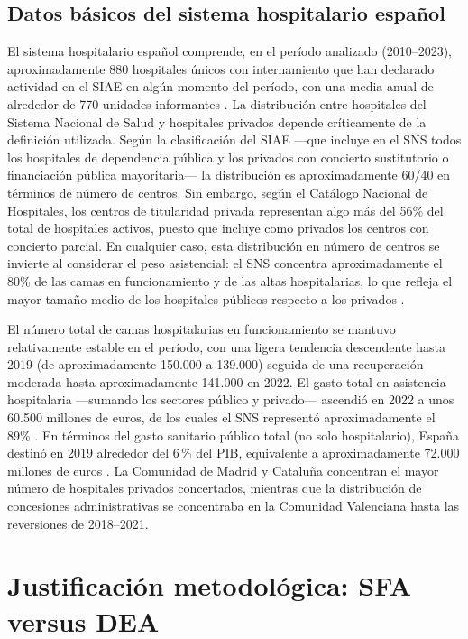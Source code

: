 \subsection{Datos básicos del sistema hospitalario español}

El sistema hospitalario español comprende, en el período analizado 
(2010--2023), aproximadamente 880 hospitales únicos con internamiento 
que han declarado actividad en el SIAE en algún momento del período, 
con una media anual de alrededor de 770 unidades informantes 
\citep{ministerio_siae2023}. La distribución entre hospitales del 
Sistema Nacional de Salud y hospitales privados depende críticamente 
de la definición utilizada. Según la clasificación del SIAE 
---que incluye en el SNS todos los hospitales de dependencia pública 
y los privados con concierto sustitutorio o financiación pública 
mayoritaria--- la distribución es aproximadamente 60/40 en términos 
de número de centros. Sin embargo, según el Catálogo Nacional de 
Hospitales, los centros de titularidad privada representan algo más 
del 56\% del total de hospitales activos, puesto que incluye como 
privados los centros con concierto parcial. En cualquier caso, 
esta distribución en número de centros se invierte al considerar 
el peso asistencial: el SNS concentra aproximadamente el 80\% de 
las camas en funcionamiento y de las altas hospitalarias, lo que 
refleja el mayor tamaño medio de los hospitales públicos respecto 
a los privados \citep{ministerio_siae2022}.

El número total de camas hospitalarias en funcionamiento se mantuvo 
relativamente estable en el período, con una ligera tendencia 
descendente hasta 2019 (de aproximadamente 150.000 a 139.000) 
seguida de una recuperación moderada hasta aproximadamente 141.000 
en 2022. El gasto total en asistencia hospitalaria ---sumando 
los sectores público y privado--- ascendió en 2022 a unos 
60.500 millones de euros, de los cuales el SNS representó 
aproximadamente el 89\% \citep{ministerio_siae2022}. En términos 
del gasto sanitario público total (no solo hospitalario), España 
destinó en 2019 alrededor del 6\,\% del PIB, equivalente a 
aproximadamente 72.000 millones de euros \citep{observatorioHIT2024}.
La Comunidad de Madrid y Cataluña concentran el mayor número de 
hospitales privados concertados, mientras que la distribución de 
concesiones administrativas se concentraba en la Comunidad 
Valenciana hasta las reversiones de 2018--2021.
\section{Justificación metodológica: SFA versus DEA}
\label{sec:justificacion_metodologica}

